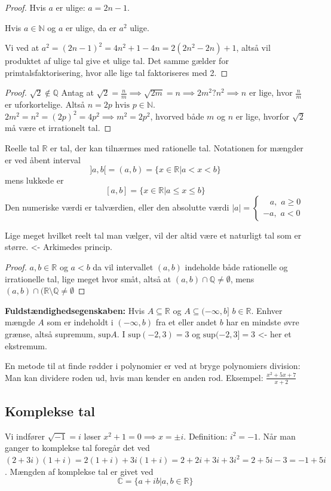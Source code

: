 \begin{proof}{Hvis $a$ er ulige: $a=2n-1$.}
\begin{lemma}Hvis $a\in\mathbb{N}$ og $a$ er ulige, da er $a^2$ ulige.\end{lemma}
Vi ved at $a^2=(2n-1)^2=4n^2+1-4n=2(2n^2-2n)+1$, altså vil produktet af ulige tal give et ulige tal. Det samme gælder for primtalsfaktorisering, hvor alle lige tal faktoriseres med 2.
\end{proof}

\begin{proof}{$\sqrt{2}\notin\mathbb{Q}$}
Antag at $\sqrt{2}=\frac{n}{m}\implies\sqrt{2m}=n\implies2m^2?n^2\implies n\text{ er lige}$, hvor $\frac{n}{m}$ er uforkortelige. Altså $n=2p\text{ hvis }p\in\mathbb{N}$.\\$2m^2=n^2=(2p)^2=4p^2\implies m^2=2p^2$, hvorved både $m$ og $n$ er lige, hvorfor $\sqrt{2}$ må være et irrationelt tal.
\end{proof}
Reelle tal $\mathbb{R}$ er tal, der kan tilnærmes med rationelle tal. Notationen for mængder er ved åbent interval $$]a,b[=(a,b)=\lbrace x\in\mathbb{R}|a<x<b\rbrace$$mens lukkede er $$[a,b]=\lbrace x\in\mathbb{R}|a\leq x\leq b\rbrace$$Den numeriske værdi er talværdien, eller den absolutte værdi $|a|=\begin{cases}
    \,\,\,\,\,a, \,\, a\geq0\\
    -a, \,\,a<0
  \end{cases}$
  
Lige meget hvilket reelt tal man vælger, vil der altid være et naturligt tal som er større. <- Arkimedes princip.

\begin{proof}{$a,b\in\mathbb{R}$ og $a<b$ da vil intervallet $(a,b)$ indeholde både rationelle og irrationelle tal, lige meget hvor småt, altså at $(a,b)\cap \mathbb{Q}\neq \emptyset$}, mens $(a,b)\cap(\mathbb{R}\setminus\mathbb{Q}\neq\emptyset$

\end{proof}
\textbf{Fuldstændighedsegenskaben:} Hvis $A\subseteq\mathbb{R}$ og $A\subseteq(-\infty,b]$ $b\in\mathbb{R}$. Enhver mængde $A$ som er indeholdt i $(-\infty,b)$ fra et eller andet $b$ har en mindste øvre grænse, altså supremum, $\text{sup}A$. I $\text{sup}(-2,3)=3$ og $\text{sup}(-2,3]=3$ <- her et ekstremum.

En metode til at finde rødder i polynomier er ved at bryge polynomiers division: Man kan dividere roden ud, hvis man kender en anden rod. Eksempel: $\frac{x^2+5x+7}{x+2}$

\subsection{Komplekse tal}Vi indfører $\sqrt{-1}=i$ løser $x^2+1=0\implies x=\pm i$. Definition: $i^2=-1$. Når man ganger to komplekse tal foregår det ved $(2+3i)(1+i)=2(1+i)+3i(1+i)=2+2i+3i+3i^2=2+5i-3=-1+5i$. Mængden af komplekse tal er givet ved \begin{equation}
    \mathbb{C}=\{a+ib|a,b\in\mathbb{R}\}
\end{equation}
